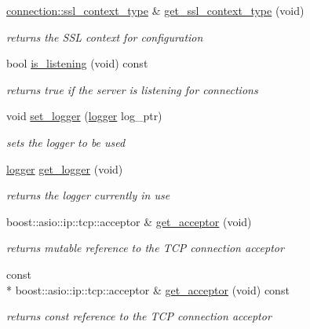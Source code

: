 \begin{DoxyCompactItemize}
\hyperlink{classpion_1_1tcp_1_1connection_a8587c35bbf48a119aa82f228e779a30e}{connection\-::ssl\-\_\-context\-\_\-type} \& \hyperlink{classpion_1_1tcp_1_1server_a11201c6b34424ff5ec11c963629281ed}{get\-\_\-ssl\-\_\-context\-\_\-type} (void)
\begin{DoxyCompactList}\small\item\em returns the S\-S\-L context for configuration \end{DoxyCompactList}\item 
bool \hyperlink{classpion_1_1tcp_1_1server_acf9efd8fcf78fc352744489e388b0f7c}{is\-\_\-listening} (void) const 
\begin{DoxyCompactList}\small\item\em returns true if the server is listening for connections \end{DoxyCompactList}\item 
void \hyperlink{classpion_1_1tcp_1_1server_abe68393818a75e45d49757532802361e}{set\-\_\-logger} (\hyperlink{structpion_1_1logger}{logger} log\-\_\-ptr)
\begin{DoxyCompactList}\small\item\em sets the logger to be used \end{DoxyCompactList}\item 
\hyperlink{structpion_1_1logger}{logger} \hyperlink{classpion_1_1tcp_1_1server_af038c70801875d3d6a3826eb7a80b1c3}{get\-\_\-logger} (void)
\begin{DoxyCompactList}\small\item\em returns the logger currently in use \end{DoxyCompactList}\item 
boost\-::asio\-::ip\-::tcp\-::acceptor \& \hyperlink{classpion_1_1tcp_1_1server_a41d5b598e52f70db5ae4302bb02370b8}{get\-\_\-acceptor} (void)
\begin{DoxyCompactList}\small\item\em returns mutable reference to the T\-C\-P connection acceptor \end{DoxyCompactList}\item 
const \\*
boost\-::asio\-::ip\-::tcp\-::acceptor \& \hyperlink{classpion_1_1tcp_1_1server_a98de565795e8a1e978d21e7232990efe}{get\-\_\-acceptor} (void) const 
\begin{DoxyCompactList}\small\item\em returns const reference to the T\-C\-P connection acceptor \end{DoxyCompactList}\end{DoxyCompactItemize}
